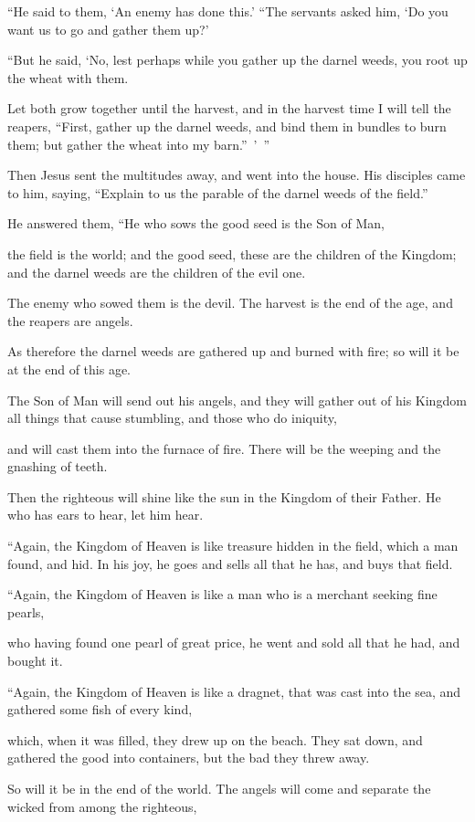 “He said to them, ‘An enemy has done this.’ “The servants asked him, ‘Do you want us to go and gather them up?’

“But he said, ‘No, lest perhaps while you gather up the darnel weeds, you root up the wheat with them.

Let both grow together until the harvest, and in the harvest time I will tell the reapers, “First, gather up the darnel weeds, and bind them in bundles to burn them; but gather the wheat into my barn.” ’ ”

Then Jesus sent the multitudes away, and went into the house. His disciples came to him, saying, “Explain to us the parable of the darnel weeds of the field.”

He answered them, “He who sows the good seed is the Son of Man,

the field is the world; and the good seed, these are the children of the Kingdom; and the darnel weeds are the children of the evil one.

The enemy who sowed them is the devil. The harvest is the end of the age, and the reapers are angels.

As therefore the darnel weeds are gathered up and burned with fire; so will it be at the end of this age.

The Son of Man will send out his angels, and they will gather out of his Kingdom all things that cause stumbling, and those who do iniquity,

and will cast them into the furnace of fire. There will be the weeping and the gnashing of teeth.

Then the righteous will shine like the sun in the Kingdom of their Father. He who has ears to hear, let him hear.

“Again, the Kingdom of Heaven is like treasure hidden in the field, which a man found, and hid. In his joy, he goes and sells all that he has, and buys that field.

“Again, the Kingdom of Heaven is like a man who is a merchant seeking fine pearls,

who having found one pearl of great price, he went and sold all that he had, and bought it.

“Again, the Kingdom of Heaven is like a dragnet, that was cast into the sea, and gathered some fish of every kind,

which, when it was filled, they drew up on the beach. They sat down, and gathered the good into containers, but the bad they threw away.

So will it be in the end of the world. The angels will come and separate the wicked from among the righteous,

